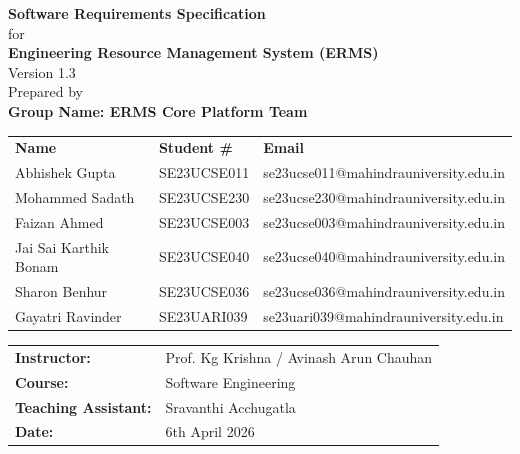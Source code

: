 \documentclass[12pt]{article}
\begin{document}
\begin{titlepage}
\centering
\vspace*{2cm}

{\LARGE \textbf{Software Requirements Specification}}\\[0.5cm]
{\large for}\\[0.5cm]
{\LARGE \textbf{Engineering Resource Management System (ERMS)}}\\[0.5cm]
{\large Version 1.3}\\[2cm]

{\large Prepared by}\\[0.5cm]
{\large \textbf{Group Name: ERMS Core Platform Team}}\\[1cm]

\begin{tabular}{l l l}
\textbf{Name} & \textbf{Student \#} & \textbf{Email} \\[0.3cm]
Abhishek Gupta      & SE23UCSE011 & se23ucse011@mahindrauniversity.edu.in \\[0.3cm]
Mohammed Sadath     & SE23UCSE230 & se23ucse230@mahindrauniversity.edu.in \\[0.3cm]
Faizan Ahmed        & SE23UCSE003 & se23ucse003@mahindrauniversity.edu.in \\[0.3cm]
Jai Sai Karthik Bonam & SE23UCSE040 & se23ucse040@mahindrauniversity.edu.in \\[0.3cm]
Sharon Benhur       & SE23UCSE036 & se23ucse036@mahindrauniversity.edu.in \\[0.3cm]
Gayatri Ravinder    & SE23UARI039 & se23uari039@mahindrauniversity.edu.in \\[0.3cm]
\end{tabular}
\vfill

\begin{tabular}{l l}
\textbf{Instructor:}       & Prof. Kg Krishna / Avinash Arun Chauhan \\[0.3cm]
\textbf{Course:}           & Software Engineering \\[0.3cm]
\textbf{Teaching Assistant:} & Sravanthi Acchugatla \\[0.3cm]
\textbf{Date:}             & 6th April 2026 \\
\end{tabular}

\end{titlepage}

\tableofcontents
\newpage
\end{document}
